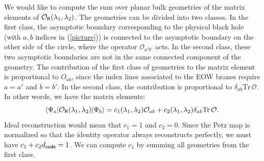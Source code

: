 \documentclass[12pt]{article}
\newcommand{\be}{\begin{equation}}
\newcommand{\ee}{\end{equation}}
\numberwithin{equation}{section}
\def\tr{\text{Tr}}
\begin{document}
We would like to compute the sum over planar bulk geometries of the matrix elements of $\mathcal{O}_{\sf{R}}(\lambda_1,\lambda_2)$. The geometries can be divided into two classes. In the first class, the asymptotic boundary corresponding to the physical black hole (with $a,b$ indices in (\ref{picture})) is connected to the asymptotic boundary on the other side of the circle, where the operator $\mathcal{O}_{a'b'}$ acts. In the second class, these two asymptotic boundaries are not in the same connected component of the geometry. The contribution of the first class of geometries to the matrix element is proportional to $O_{ab}$, since the index lines associated to the EOW branes require $a = a'$ and $b = b'$. In the second class, the contribution is proportional to $ \delta _{ab}\tr\, \mathcal{O}$. In other words, we have the matrix elements:
\be
\langle\Psi_a|\mathcal{O}_{\sf{R}}(\lambda_1,\lambda_2)|\Psi_b\rangle=c_1(\lambda_1,\lambda_2) \mathcal{O}_{ab}+c_2(\lambda_1,\lambda_2)\delta_{ab} \tr \, \mathcal{O}.
\ee
Ideal reconstruction would mean that $c_1 = 1$ and $c_2 = 0$. Since the Petz map is normalized so that the identity operator always reconstructs perfectly, we must have $c_1+c_2 d_{\sf{code}}=1$. We can compute $c_1$ by summing all geometries from the first class.
\end{document}
